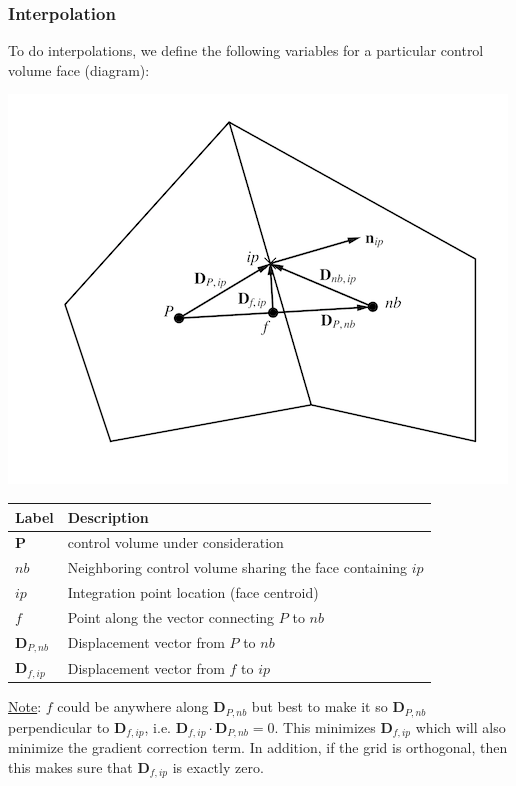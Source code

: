 \documentclass[11pt]{article}
\begin{document}
\subsubsection{Interpolation}
\label{sec:org0776e5e}
To do interpolations, we define the following variables for a particular control volume face (diagram):
\begin{center}
\includegraphics[scale=1.7]{../pic/NotationDiagram.png}
\end{center}
\begin{center}
\begin{tabular}{ll}
Label & Description\\
\hline
\textbf{P} & control volume under consideration\\
\(nb\) & Neighboring control volume sharing the face containing \(ip\)\\
\(ip\) & Integration point location (face centroid)\\
\(f\) & Point along the vector connecting \(P\) to \(nb\)\\
\(\textbf{D}_{P,nb}\) & Displacement vector from \(P\) to \(nb\)\\
\(\textbf{D}_{f,ip}\) & Displacement vector from \(f\) to \(ip\)\\
\hline
\end{tabular}
\end{center}

\uline{Note}: \(f\) could be anywhere along \(\textbf{D}_{P,nb}\) but best to make it so \(\textbf{D}_{P,nb}\)
perpendicular to \(\textbf{D}_{f,ip}\), i.e. \(\textbf{D}_{f,ip} \cdot \textbf{D}_{P,nb} = 0\). This minimizes
\(\textbf{D}_{f,ip}\) which will also minimize the gradient correction term. In addition,
if the grid is orthogonal, then this makes sure that \(\textbf{D}_{f,ip}\) is exactly zero.
\end{document}
